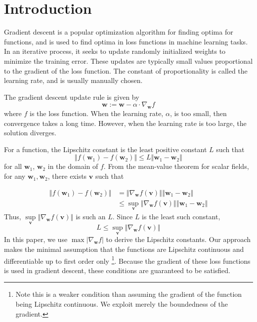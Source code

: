 \documentclass[sigconf,authordraft]{acmart}
\begin{document}
\maketitle

\section{Introduction}
Gradient descent\cite{cauchy1847methode} is a popular optimization algorithm for finding optima for functions, and is used to find optima in loss functions in machine learning tasks. In an iterative process, it seeks to update randomly initialized weights to minimize the training error. These updates are typically small values proportional to the gradient of the loss function. The constant of proportionality is called the learning rate, and is usually manually chosen.

The gradient descent update rule is given by
\[
    \textbf{w} := \textbf{w} - \alpha \cdot \nabla_{\textbf{w}} f
\]
where $f$ is the loss function. When the learning rate, $\alpha$, is too small, then convergence takes a long time. However, when the learning rate is too large, the solution diverges. 

For a function, the Lipschitz constant is the least positive constant $L$ such that 
\[
    \left\Vert f(\textbf{w}_1) - f(\textbf{w}_2)\right\Vert \leq L \left\Vert \textbf{w}_1 - \textbf{w}_2 \right\Vert
\]
for all $\textbf{w}_1$, $\textbf{w}_2$ in the domain of $f$. From the mean-value theorem for scalar fields, for any $\textbf{w}_1, \textbf{w}_2$, there exists $\textbf{v}$ such that 

\[
    \begin{aligned}
        \left\Vert f(\textbf{w}_1) - f(\textbf{w}_2) \right\Vert &= \left\Vert \nabla_{\textbf{w}} f(\textbf{v}) \right\Vert \left\Vert \textbf{w}_1-\textbf{w}_2 \right\Vert \\
        &\leq \sup\limits_{\textbf{v}} \left\Vert \nabla_{\textbf{w}} f(\textbf{v}) \right\Vert \left\Vert \textbf{w}_1-\textbf{w}_2 \right\Vert
    \end{aligned}
\]
Thus, $\sup\limits_{\textbf{v}} \left\Vert \nabla_{\textbf{w}} f(\textbf{v}) \right\Vert$ is such an $L$. Since $L$ is the least such constant, 
\[
    L \leq \sup\limits_{\textbf{v}} \left\Vert \nabla_{\textbf{w}} f(\textbf{v}) \right\Vert
\]
In this paper, we use $\max |\nabla_{\textbf{w}} f|$ to derive the Lipschitz constants. Our approach makes the minimal assumption that the functions are Lipschitz continuous and differentiable up to first order only \footnote{Note this is a weaker condition than assuming the gradient of the function being Lipschitz continuous. We exploit merely the boundedness of the gradient.}. Because the gradient of these loss functions is used in gradient descent, these conditions are guaranteed to be satisfied.
\end{document}
